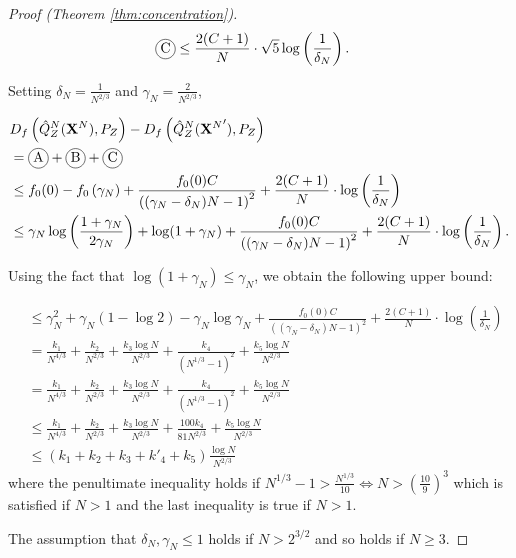 \begin{proof}[Proof (Theorem \ref{thm:concentration})]
\begin{align*}
    \encircle{C} &\leq \frac{2(C+1)}{N} \cdot \sqrt{5}\log\left(\frac{1}{\delta_N}\right).
\end{align*}


Setting $\delta_N = \frac{1}{N^{2/3}}$ and $\gamma_N = \frac{2}{N^{2/3}}$,

\begin{align*}
    &D_f\left( \hat{Q}_Z^N(\XN) , P_Z\right) - D_f\left( \hat{Q}_Z^N({\XN}') , P_Z\right) \\
    &= \encircle{A} + \encircle{B} + \encircle{C} \\
    &\leq f_0(0) - f_0\left(\gamma_N\right) + \frac{f_0(0)C}{\left((\gamma_N-\delta_N)N - 1\right)^2} + \frac{2(C+1)}{N} \cdot \log\left(\frac{1}{\delta_N}\right) \\
    &\leq \gamma_N \log\left(\frac{1+\gamma_N}{2\gamma_N}\right) + \log(1+\gamma_N) + \frac{f_0(0)C}{\left((\gamma_N-\delta_N)N - 1\right)^2} + \frac{2(C+1)}{N} \cdot \log\left(\frac{1}{\delta_N}\right).\\
\end{align*}

Using the fact that $\log(1+\gamma_N)\leq \gamma_N$, we obtain the following upper bound:

\begin{align*}
    &\leq \gamma_N^2 + \gamma_N(1-\log 2 ) - \gamma_N \log \gamma_N + \frac{f_0(0)C}{\left((\gamma_N-\delta_N)N - 1\right)^2} + \frac{2(C+1)}{N} \cdot \log\left(\frac{1}{\delta_N}\right)\\
    &= \frac{k_1}{N^{4/3}} + \frac{k_2}{N^{2/3}} + \frac{k_3\log N}{N^{2/3}} + \frac{k_4}{(N^{1/3} - 1)^2} +\frac{k_5 \log N }{ N^{2/3}} \\
    &= \frac{k_1}{N^{4/3}} + \frac{k_2}{N^{2/3}} + \frac{k_3\log N}{N^{2/3}} + \frac{k_4}{(N^{1/3} - 1)^2} +\frac{k_5 \log N }{ N^{2/3}} \\
    &\leq \frac{k_1}{N^{4/3}} + \frac{k_2}{N^{2/3}} + \frac{k_3\log N}{N^{2/3}} + \frac{100k_4}{81N^{2/3}} +\frac{k_5 \log N }{ N^{2/3}} \\
    &\leq (k_1+k_2+k_3+k'_4 + k_5)\frac{\log N}{N^{2/3}}
\end{align*}
where the penultimate inequality holds if $N^{1/3}-1 > \frac{N^{1/3}}{10} \iff N>\left(\frac{10}{9}\right)^3$ which is satisfied if $N>1$ and the last inequality is true if $N>1$.

The assumption that $\delta_N, \gamma_N \leq 1$ holds if $N>2^{3/2}$ and so holds if $N\geq3$.


\end{proof}
